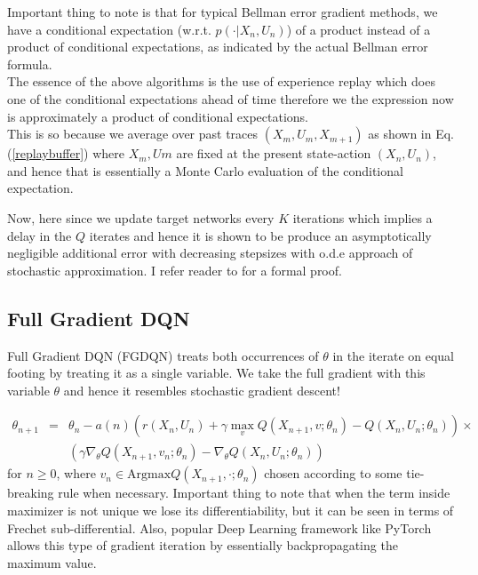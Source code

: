 \documentclass{article}
\theoremstyle{definition}
\begin{document}
Important thing to note is that for typical Bellman error gradient methods,  we have
a conditional expectation (w.r.t. $p(\cdot|X_n, U_n)$) of a product instead of a product of conditional expectations, as indicated by the actual Bellman error formula. \\
The essence of the above algorithms is the use of experience replay which does one of the conditional expectations ahead of time therefore we the expression now is approximately a product of conditional expectations. \\
This is so because we average over past traces $(X_m, U_m, X_{m+1})$ as shown in Eq. (\ref{replaybuffer}) where $X_m, Um$ are fixed at the present state-action $(X_n, U_n)$, and hence that is essentially a Monte Carlo evaluation of the conditional expectation.

Now, here since we update target networks every $K$ iterations which implies a delay in the $Q$ iterates and hence it is shown to be produce an asymptotically negligible additional error with decreasing stepsizes with o.d.e approach of stochastic approximation. I refer reader to \cite{avrachenkov2021gradient} for a formal proof.
\subsection{Full Gradient DQN}
Full Gradient DQN (FGDQN) \cite{avrachenkov2021gradient} treats both occurrences of $\theta$ in the iterate on equal footing by treating it as a single variable. We take the full gradient with this variable $\theta$ and hence it resembles stochastic gradient descent!

\begin{eqnarray}
\theta_{n+1} &=& \theta_n - a(n)\left(r(X_n,U_n) + \gamma\max_v Q(X_{n+1}, v; \theta_n) - Q(X_n, U_n;\theta_n)\right)\times \nonumber \\
&& \left(\gamma\nabla_\theta Q(X_{n+1}, v_n; \theta_n) - \nabla_\theta Q(X_n, U_n; \theta_n)\right)
\label{FG-DQN}
\end{eqnarray}
for $n \geq 0$, where  $v_n \in \mbox{Argmax} Q(X_{n+1}, \cdot ; \theta_n)$ chosen according to some tie-breaking rule when necessary. Important thing to note that when the term inside maximizer is not unique we lose its differentiability, but it can be seen in terms of Frechet sub-differential. Also, popular Deep Learning framework like PyTorch \cite{pytorch} allows this type of gradient iteration by essentially backpropagating the maximum value. 
\end{document}
